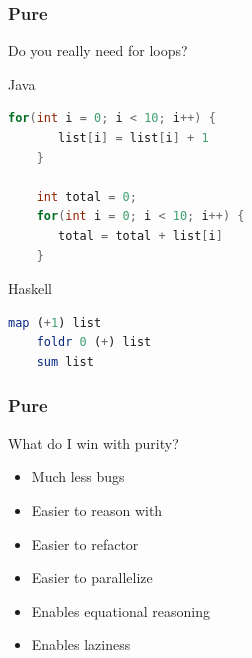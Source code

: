 \documentclass{beamer}
\begin{document}
\begin{frame}[fragile]
\frametitle{Pure}
Do you really need for loops?

 \begin{block}{Java}
  \begin{lstlisting}[language=Java]
    for(int i = 0; i < 10; i++) {
       list[i] = list[i] + 1 
    }

    int total = 0;
    for(int i = 0; i < 10; i++) {
       total = total + list[i] 
    }

  \end{lstlisting}
 \end{block}
 
 \begin{block}{Haskell}
  \begin{lstlisting}[language=Haskell]
    map (+1) list
    foldr 0 (+) list
    sum list
  \end{lstlisting}
 \end{block}

\end{frame}

\begin{frame}
\frametitle{Pure}

What do I win with purity?
 \vspace{0.5cm}
 \begin{itemize}
  \item Much less bugs
  \item Easier to reason with
  \item Easier to refactor
  \item Easier to parallelize
  \item Enables equational reasoning
  \item Enables laziness
 \end{itemize}
 
\end{frame}
\end{document}
